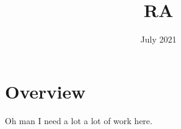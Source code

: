 \documentclass[main.tex]{subfiles}
\title{RA}
\date{July 2021}
\begin{document}
\maketitle

\section{Overview}
Oh man I need a lot a lot of work here.
\end{document}
